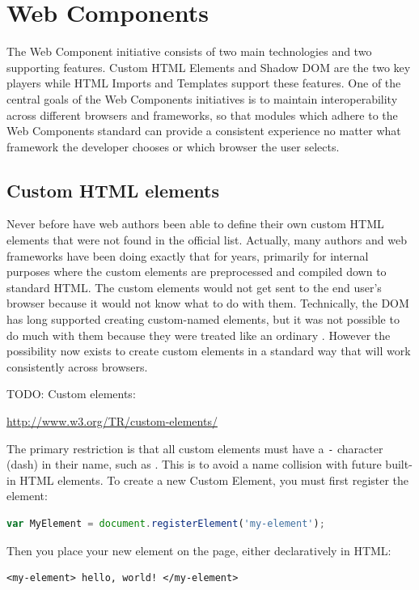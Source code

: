 \section{Web Components}

The Web Component initiative consists of two main technologies and two supporting features. 
Custom HTML Elements and Shadow DOM are the two key players while HTML Imports and Templates support these features. One of the central goals of the Web Components initiatives is to maintain interoperability across different browsers and frameworks, so that modules which adhere to the Web Components standard can provide a consistent experience no matter what framework the developer chooses or which browser the user selects.

\subsection{Custom HTML elements}
Never before have web authors been able to define their own custom HTML elements that were not found in the official list.
Actually, many authors and web frameworks have been doing exactly that for years, primarily for internal purposes where the custom elements are pre\-processed and compiled down to standard HTML.
The custom elements would not get sent to the end user's browser because it would not know what to do with them.
Technically, the DOM has long supported creating custom-named elements, but it was not possible to do much with them because they were treated like an ordinary .
However the possibility now exists to create custom elements in a standard way that will work consistently across browsers. 

TODO: Custom elements:

\url{http://www.w3.org/TR/custom-elements/}

The primary restriction is that all custom elements must have a \texttt{-} character (dash) in their name, such as . 
This is to avoid a name collision with future built-in HTML elements. 
To create a new Custom Element, you must first register the element:

\begin{lstlisting}[language=JavaScript,numbers=none]
 var MyElement = document.registerElement('my-element');
\end{lstlisting}

Then you place your new element on the page, either declaratively in HTML:

\begin{lstlisting}[language=HTML5,numbers=none]
 <my-element> hello, world! </my-element>
\end{lstlisting}

